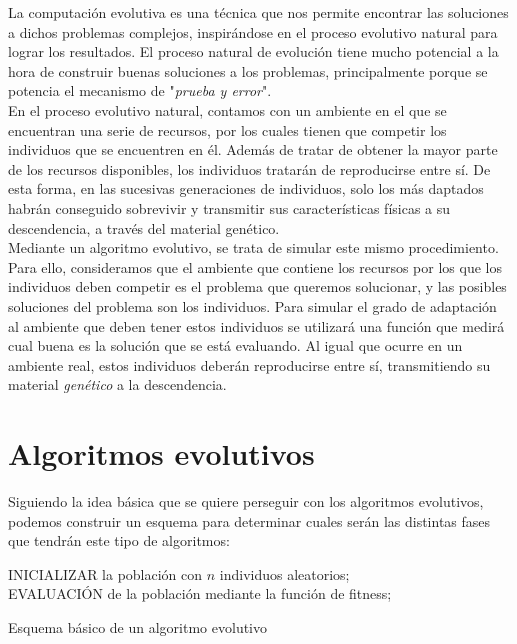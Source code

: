 La computación evolutiva es una técnica que nos permite encontrar las soluciones a dichos problemas complejos, inspirándose en el proceso evolutivo natural para lograr los resultados. El proceso natural de evolución tiene mucho potencial a la hora de construir buenas soluciones a los problemas, principalmente porque se potencia el mecanismo de "\textit{prueba y error}". \\

En el proceso evolutivo natural, contamos con un ambiente en el que se encuentran una serie de recursos, por los cuales tienen que competir los individuos que se encuentren en él. Además de tratar de obtener la mayor parte de los recursos disponibles, los individuos tratarán de reproducirse entre sí. De esta forma, en las sucesivas generaciones de individuos, solo los más daptados habrán conseguido sobrevivir y transmitir sus características físicas a su descendencia, a través del material genético. \\

Mediante un algoritmo evolutivo, se trata de simular este mismo procedimiento. Para ello, consideramos que el ambiente que contiene los recursos por los que los individuos deben competir es el problema que queremos solucionar, y las posibles soluciones del problema son los individuos. Para simular el grado de adaptación al ambiente que deben tener estos individuos se utilizará una función que medirá cual buena es la solución que se está evaluando. Al igual que ocurre en un ambiente real, estos individuos deberán reproducirse entre sí, transmitiendo su material \textit{genético} a la descendencia. \\

\section{Algoritmos evolutivos}
\label{1:sec:3}

Siguiendo la idea básica que se quiere perseguir con los algoritmos evolutivos, podemos construir un esquema para determinar cuales serán las distintas fases que tendrán este tipo de algoritmos:

\begin{algorithm}[H]
 INICIALIZAR la población con $n$ individuos aleatorios;\\
 EVALUACIÓN de la población mediante la función de fitness;
 
 \caption{Esquema básico de un algoritmo evolutivo}
\end{algorithm}

